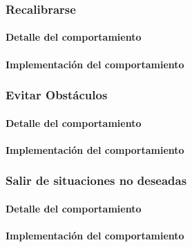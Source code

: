 \subsubsection{Recalibrarse}
\label{recalibrate}
\paragraph{Detalle del comportamiento}
\paragraph{Implementaci\'on del comportamiento}

\subsubsection{Evitar Obst\'aculos}
\label{avoid_obstacles}
\paragraph{Detalle del comportamiento}
\paragraph{Implementaci\'on del comportamiento}

\subsubsection{Salir de situaciones no deseadas}
\label{out_of_unwanted_situations}
\paragraph{Detalle del comportamiento}
\paragraph{Implementaci\'on del comportamiento}

